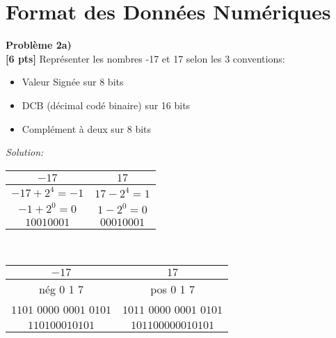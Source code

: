 \documentclass{article}
\newenvironment{problem}[2][Problème]
    { \begin{mdframed}[backgroundcolor=gray!20] \textbf{#1 #2} \\}
    {  \end{mdframed}}
\newenvironment{solution}
    {\textit{Solution:}}
    {}
\begin{document}
\section{Format des Données Numériques}

\begin{problem}{2a)}
\textbf{[6 pts]} Représenter les nombres -17 et 17 selon les 3 conventions:
    \begin{itemize}
        \item Valeur Signée sur 8 bits
        \item DCB (décimal codé binaire) sur 16 bits
        \item Complément à deux sur 8 bits
    \end{itemize}
\end{problem}

\begin{solution}
    \begin{tabular}{c|c}
        $-17$ & $17$\\
        \hline
        $-17+2^4 = -1$ & $17-2^4 = 1$\\
        $-1+2^0=0$&$1-2^0=0$\\
        $10010001$&$00010001$
    \end{tabular}
    \\
    \begin{tabular}[20pt]{c|c}
        $-17$ & $17$\\
        \hline
        nég \hspace{12pt}0 \hspace{12pt}1 \hspace{12pt} 7 \hspace{12pt}&pos \hspace{12pt}0 \hspace{12pt}1 \hspace{12pt} 7\\
        $1101$ $0000$ $0001$ $0101$ &$1011$ $0000$ $0001$ $0101$\\
        $110100010101$& $101100000010101$
    \end{tabular}
\end{solution}
\end{document}
